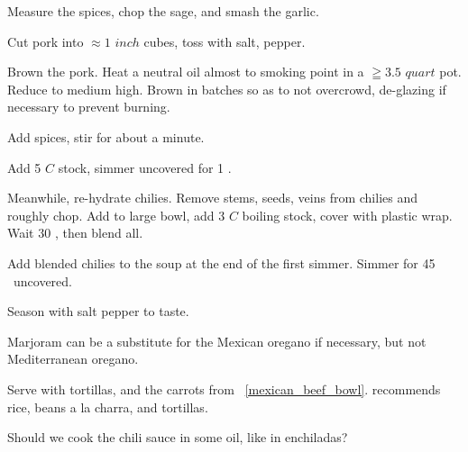 \begin{preparation}
\item Measure the spices, chop the sage, and smash the garlic.

\item Cut pork into $\approx1$ $inch$ cubes, toss with salt, pepper.

\item Brown the pork.
    Heat a neutral oil almost to smoking point in a $ \geqq 3.5$ $quart$ pot.
    Reduce to medium high.
    Brown in batches so as to not overcrowd, de-glazing if necessary to prevent burning.

\item Add spices, stir for about a minute.

\item Add 5 $C$ stock, simmer uncovered for 1 \hour.

\item Meanwhile, re-hydrate chilies.
    Remove stems, seeds, veins from chilies and roughly chop.
    Add to large bowl, add 3 $C$ boiling stock, cover with plastic wrap.
    Wait 30 \minute, then blend all.

\item Add blended chilies to the soup at the end of the first simmer.
    Simmer for 45 \minute~uncovered.

\item Season with salt pepper to taste.
\end{preparation}

\begin{variation}
\item Marjoram can be a substitute for the Mexican oregano if necessary, but not Mediterranean oregano.

\item Serve with tortillas, and the carrots from ~\ref{mexican_beef_bowl}.
    \citeauthor{rMartinez2015} recommends rice, beans a la charra, and tortillas.
\end{variation}

\begin{experiments}
\item Should we cook the chili sauce in some oil, like in enchiladas?
\end{experiments}

\recipeend%
